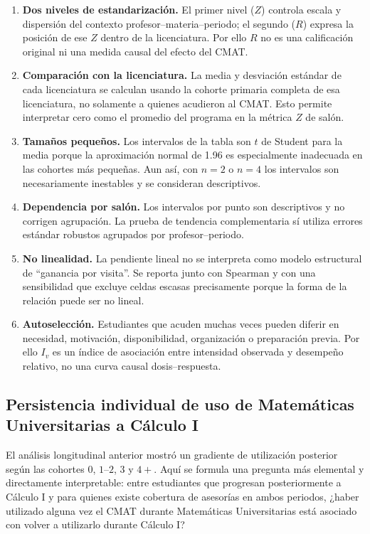 \begin{enumerate}[label=\arabic*.]
\item \textbf{Dos niveles de estandarización.} El primer nivel ($Z$) controla escala y dispersión del contexto profesor--materia--periodo; el segundo ($R$) expresa la posición de ese $Z$ dentro de la licenciatura. Por ello $R$ no es una calificación original ni una medida causal del efecto del CMAT.
\item \textbf{Comparación con la licenciatura.} La media y desviación estándar de cada licenciatura se calculan usando la cohorte primaria completa de esa licenciatura, no solamente a quienes acudieron al CMAT. Esto permite interpretar cero como el promedio del programa en la métrica $Z$ de salón.
\item \textbf{Tamaños pequeños.} Los intervalos de la tabla son $t$ de Student para la media porque la aproximación normal de 1.96 es especialmente inadecuada en las cohortes más pequeñas. Aun así, con $n=2$ o $n=4$ los intervalos son necesariamente inestables y se consideran descriptivos.
\item \textbf{Dependencia por salón.} Los intervalos por punto son descriptivos y no corrigen agrupación. La prueba de tendencia complementaria sí utiliza errores estándar robustos agrupados por profesor--periodo.
\item \textbf{No linealidad.} La pendiente lineal no se interpreta como modelo estructural de ``ganancia por visita''. Se reporta junto con Spearman y con una sensibilidad que excluye celdas escasas precisamente porque la forma de la relación puede ser no lineal.
\item \textbf{Autoselección.} Estudiantes que acuden muchas veces pueden diferir en necesidad, motivación, disponibilidad, organización o preparación previa. Por ello $I_v$ es un índice de asociación entre intensidad observada y desempeño relativo, no una curva causal dosis--respuesta.
\end{enumerate}

\subsection{Persistencia individual de uso de Matemáticas Universitarias a Cálculo I}
\label{subsec:mu_calc_2x2}

El análisis longitudinal anterior mostró un gradiente de utilización posterior según las cohortes $0$, $1$--$2$, $3$ y $4+$. Aquí se formula una pregunta más elemental y directamente interpretable: entre estudiantes que progresan posteriormente a Cálculo I y para quienes existe cobertura de asesorías en ambos periodos, ¿haber utilizado alguna vez el CMAT durante Matemáticas Universitarias está asociado con volver a utilizarlo durante Cálculo I?

